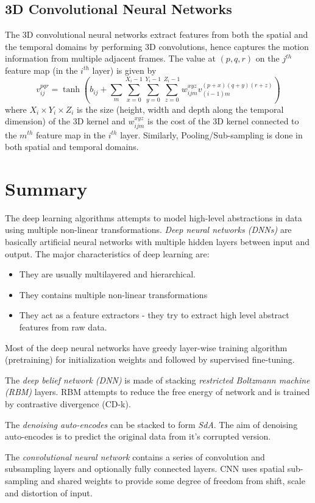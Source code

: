 \subsection{3D Convolutional Neural Networks}
The 3D convolutional neural networks extract features from both the spatial and the temporal domains by performing 3D convolutions, hence captures the motion information from multiple adjacent frames.\cite{ji20133d} The value at $(p, q, r)$ on the $j^{th}$ feature map (in the $i^{th}$ layer) is given by
$$v^{pqr}_{ij} = \tanh(b_{ij}+\sum_{m} \sum_{x=0}^{X_i-1} \sum_{y=0}^{Y_i-1} \sum_{z=0}^{Z_i-1} w^{xyz}_{ijm} v^{(p+x)(q+y)(r+z)}_{(i−1)m}) $$
where $X_i \times Y_i \times Z_i$ is the size (height, width and depth  along the temporal dimension) of the 3D kernel and $w^{xyz}_{ijm}$ is the cost of the 3D kernel connected to the $m^{th}$ feature map in the $i^{th}$ layer.  Similarly, Pooling/Sub-sampling is done in both spatial and temporal domains.

\section{Summary}
The deep learning algorithms attempts to model high-level abstractions in data using multiple non-linear transformations.  \textit{Deep neural networks (DNNs)} are basically artificial neural networks with multiple hidden layers between input and output.  The major characteristics of deep learning are:
\begin{itemize}
\item They are usually multilayered and hierarchical.
\item They contains multiple non-linear transformations 
\item They act as a feature extractors - they try to extract high level abstract features from raw data.
\end{itemize}

Most of the deep neural networks have greedy layer-wise training algorithm (pretraining) for initialization weights and followed by supervised fine-tuning.
 
The \textit{deep belief network (DNN)} is made of stacking \textit{restricted Boltzmann machine (RBM)} layers.  RBM attempts to reduce the free energy of network and is trained by contrastive divergence (CD-k).

The \textit{denoising auto-encodes} can be stacked to form \textit{SdA}.  The aim of denoising auto-encodes is to predict the original data from it's corrupted version.

The \textit{convolutional neural network} contains a series of convolution and subsampling layers and optionally fully connected layers.  CNN uses spatial sub-sampling and shared weights to provide some degree of freedom from shift, scale and distortion of input.
